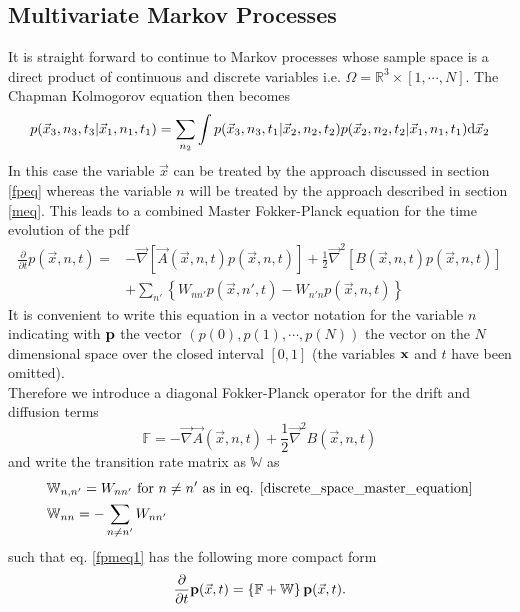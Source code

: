 \subsection{Multivariate Markov Processes}
It is straight forward to continue to Markov processes whose sample space is a direct product of continuous and discrete variables i.e. $\Omega = \mathbb{R}^{3} \times [1,\cdots, N]$. The Chapman Kolmogorov equation then becomes
\begin{equation}
    p(\vec{x}_3,n_3,t_3|\vec{x}_1,n_1,t_1) = \sum_{n_2} \int p(\vec{x}_3,n_3,t_1|\vec{x}_2,n_2,t_2)p(\vec{x}_2,n_2,t_2|\vec{x}_1,n_1,t_1) {\rm d} \vec{x}_2
    \label{MCK}
\end{equation}
In this case the variable $\vec{x}$ can be treated by the approach discussed in section \ref{fpeq} whereas the variable $n$ will be treated by the approach described in section \ref{meq}. This leads to a combined Master Fokker-Planck equation for the time evolution of the pdf
\begin{align}
    \frac{\partial}{\partial t } p(\vec{x},n,t) =   &- \vec{ \nabla } \left[\vec{A}(\vec{x},n,t)p(\vec{x},n,t) \right] + \frac{1}{2}\vec{\nabla}^{2}\left[ B(\vec{x},n,t)p(\vec{x},n,t) \right] \nonumber \\
                                                    &+ \sum_{n'} \left\{ W_{nn'}p(\vec{x},n',t) - W_{n'n}p(\vec{x},n,t)\right\}
    \label{fpmeq1}
\end{align}
It is convenient to write this equation in a vector notation for the variable $n$ indicating with $\boldsymbol{\mathbf{p}}$ the vector $(p(0),p(1),\cdots,p(N))$ the vector on the $N$ dimensional space over the closed interval $[0,1]$ (the variables $\boldsymbol{\mathbf{x}}$ and $t$ have been omitted). \\ 
Therefore we introduce a diagonal Fokker-Planck operator for the drift and diffusion terms
\begin{equation}
    \mathbb{F} = - \vec{ \nabla } \vec{A}(\vec{x},n,t) + \frac{1}{2}\vec{\nabla}^{2} B(\vec{x},n,t)
    \label{fpo}
\end{equation}
and write the transition rate matrix as $\mathbb{W}$ as
\begin{align*}
    &\mathbb{W}_{n,n'} = W_{nn'} \mbox{ for } n \ne n' \mbox{ as in eq. \eqref{discrete_space_master_equation}} \\
    &\mathbb{W}_{nn} = -\sum_{n \ne n'}W_{nn'}
\end{align*}
such that eq. \eqref{fpmeq1} has the following more compact form
\begin{equation}
    \frac{\partial}{\partial t} \boldsymbol{\mathbf{p}}(\vec{x},t) = \left\{ \mathbb{F} + \mathbb{W} \right\} \boldsymbol{\mathbf{p}}(\vec{x},t).
    \label{fpmeq2}
\end{equation}

